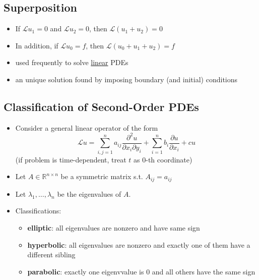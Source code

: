 \subsection{Superposition}
\begin{itemize}
    \item If $\mathcal{L} u_1 = 0$ and $\mathcal{L} u_2 = 0$, then $\mathcal{L}(u_1+u_2)=0 $
    \item In addition, if $\mathcal{L} u_0 = f$, then $\mathcal{L}(u_0+u_1+u_2) = f$
\end{itemize}
\begin{itemize}[label = $\Rightarrow$]
    \item used frequently to solve \underline{linear} PDEs
    \item an unique solution found by imposing boundary (and initial) conditions
\end{itemize}

\subsection{Classification of Second-Order PDEs}
\begin{itemize}
    \item Consider a general linear operator of the form
    \[\mathcal{L} u = \sum_{i,j=1}^{n}a_{ij} \frac{\partial^2 u}{\partial x_i \partial y_i}+\sum_{i=1}^{n}b_i \frac{\partial u}{\partial x_i}+ cu\]
    (if problem is time-dependent, treat $t$ as 0-th coordinate)
    \item Let $A \in \mathbb{R} ^{n \times n}$ be a symmetric matrix s.t. $A_{ij} = a_{ij}$
    \item Let $\lambda_1, \dots, \lambda_n$ be the eigenvalues of $A$.
    \item Classifications:
    \begin{itemize}
        \item \textbf{elliptic}: all eigenvalues are nonzero and have same sign 
        \item \textbf{hyperbolic}: all eigenvalues are nonzero and exactly one of them have a different sibling
        \item \textbf{parabolic}: exactly one eigenvvalue is 0 and all others have the same sign
    \end{itemize}
\end{itemize}



